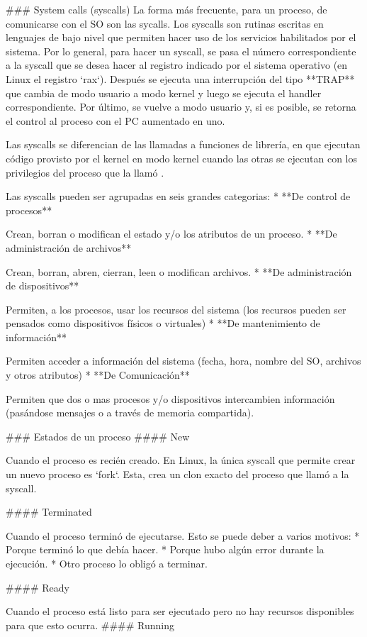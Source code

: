 ### System calls (syscalls)
La forma más frecuente, para un proceso, de comunicarse con el SO son las sycalls. Los syscalls son rutinas escritas en lenguajes de bajo nivel que permiten hacer uso de los servicios habilitados por el sistema. Por lo general, para hacer un syscall, se pasa el número correspondiente a la syscall que se desea hacer al registro indicado por el sistema operativo (en Linux el registro `rax`). Después se ejecuta una interrupción del tipo **TRAP** que cambia de modo usuario a modo kernel y luego se ejecuta el handler correspondiente. Por último, se vuelve a modo usuario y, si es posible, se retorna el control al proceso con el PC aumentado en uno.

Las syscalls se diferencian de las llamadas a funciones de librería, en que ejecutan código provisto por el kernel en modo kernel cuando las otras se ejecutan con los privilegios del proceso que la llamó .

Las syscalls pueden ser agrupadas en seis grandes categorias:
* **De control de procesos**

Crean, borran o modifican el estado y/o los atributos de un proceso.
* **De administración de archivos**

Crean, borran, abren, cierran, leen o modifican archivos.
* **De administración de dispositivos**

Permiten, a los procesos, usar los recursos del sistema (los recursos pueden ser pensados como dispositivos físicos o virtuales)
* **De mantenimiento de información**

Permiten acceder a información del sistema (fecha, hora, nombre del SO, archivos y otros atributos)
* **De Comunicación**

Permiten que dos o mas procesos y/o dispositivos intercambien información (pasándose mensajes o a través de memoria compartida).

### Estados de un proceso
#### New

Cuando el proceso es recién creado. En Linux, la única syscall que permite crear un nuevo proceso es `fork`. Esta, crea un clon exacto del proceso que llamó a la syscall.

#### Terminated

Cuando el proceso terminó de ejecutarse. Esto se puede deber a varios motivos:
* Porque terminó lo que debía hacer.
* Porque hubo algún error durante la ejecución.
* Otro proceso lo obligó a terminar.

#### Ready

Cuando el proceso está listo para ser ejecutado pero no hay recursos disponibles para que esto ocurra.
#### Running

